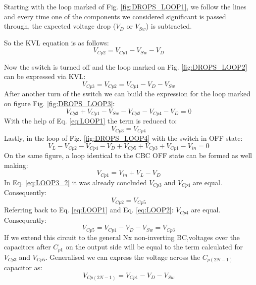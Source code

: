 Starting with the loop marked of Fig. \ref{fig:DROPS_LOOP1}, we follow the lines and every time one of the components we considered significant is passed through, the expected voltage drop ($V_D$ or $V_{Sw}$) is subtracted.

So the KVL equation is as follows: 
\begin{equation}
	V_{Cp2} = V_{Cp1}-V_{Sw}-V_D
	\label{eq:LOOP1}
\end{equation}

Now the switch is turned off and the loop marked on Fig. \ref{fig:DROPS_LOOP2} can be expressed via KVL: 
\begin{equation}
	V_{Cp3} = V_{Cp2}=V_{Cp1}-V_D-V_{Sw}
	\label{eq:LOOP2}
\end{equation}
After another turn of the switch we can build the expression for the loop marked on figure Fig. \ref{fig:DROPS_LOOP3}:
\begin{equation}
	V_{Cp3}+V_{Cp1}-V_{Sw}-V_{Cp2}-V_{Cp4}-V_D=0
	\label{eq:LOOP3_1}
\end{equation}
With the help of Eq. \ref{eq:LOOP1} the term is reduced to:
\begin{equation}
	V_{Cp3} = V_{Cp4}
	\label{eq:LOOP3_2}
\end{equation}
Lastly, in the loop of Fig. \ref{fig:DROPS_LOOP4} with the switch in OFF state:
\begin{equation}
	V_L-V_{Cp2}-V_{Cp4}-V_D+V_{Cp5}+V_{Cp3}+V_{Cp1}-V_{in}= 0
	\label{eq:LOOP4_1}
\end{equation}
On the same figure, a loop identical to the CBC OFF state can be formed as well making:
\begin{equation}
	V_{Cp1}=V_{in}+V_L-V_D
	\label{eq:LOOP4_2}
\end{equation}
In Eq. \ref{eq:LOOP3_2} it was already concluded $V_{Cp3}$ and $V_{Cp4}$ are equal. Consequently: 
\begin{equation}
	V_{Cp2} = V_{Cp5}
	\label{eq:LOOP4_3}
\end{equation}
Referring back to Eq. \ref{eq:LOOP1} and Eq. \ref{eq:LOOP2}: 
$V_{Cp4}$ are equal. Consequently: 
\begin{equation}
	V_{Cp5}=V_{Cp1}-V_D-V_{Sw} =V_{Cp3} 
	\label{eq:LOOP4_4}
\end{equation}
If we extend this circuit to the general Nx non-inverting BC,voltages over the capacitors after $C_{p1}$ on the output side will be equal to the term calculated for $V_{Cp3}$ and  $V_{Cp5}$. Generalised we can express the voltage across the $C_{p(2N-1)}$ capacitor as: 
\begin{equation}
	V_{Cp(2N-1)}= V_{Cp1}-V_D-V_{Sw} 
	\label{eq:C_2N-1}
\end{equation}


